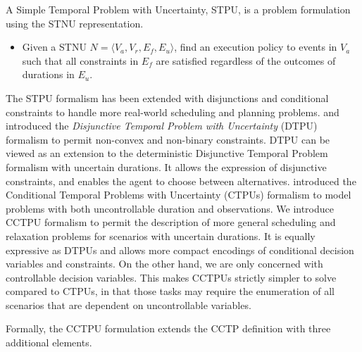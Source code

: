 \documentclass[jair,twoside,11pt,theapa]{article}
\begin{document}
\begin{mydef}

	A Simple Temporal Problem with Uncertainty, STPU, is a problem formulation
using the STNU representation.
	\begin{itemize}
	\item Given a STNU $N = \langle V_a, V_r, E_f, E_u\rangle$, find an execution
policy to  events in $V_a$ such that all constraints in $E_f$ are satisfied
regardless of the outcomes of durations in $E_u$.
	\end{itemize}
	
\end{mydef}

The STPU formalism has been extended with disjunctions and conditional
constraints to handle more real-world scheduling and planning problems.  and  introduced the \textit{Disjunctive
	Temporal Problem with Uncertainty} (DTPU) formalism to permit
non-convex and non-binary constraints. DTPU can be viewed as an extension to the
deterministic Disjunctive Temporal Problem
formalism \cite{Stergiou98backtrackingalgorithms} with uncertain durations. It
allows the expression of disjunctive constraints, and enables the agent to
choose between alternatives.  introduced the Conditional Temporal Problems with Uncertainty (CTPUs) formalism to model problems with both uncontrollable duration and observations. We introduce CCTPU formalism to permit the description of more general scheduling and relaxation problems for scenarios with uncertain durations. It is equally expressive as DTPUs and allows more compact encodings of conditional decision variables and constraints. On the other hand, we are only concerned with controllable decision variables. This makes CCTPUs strictly simpler to solve compared to CTPUs, in that those tasks may require the enumeration of all scenarios that are dependent on uncontrollable variables.

Formally, the CCTPU formulation extends the CCTP definition with three additional elements.
\end{document}
